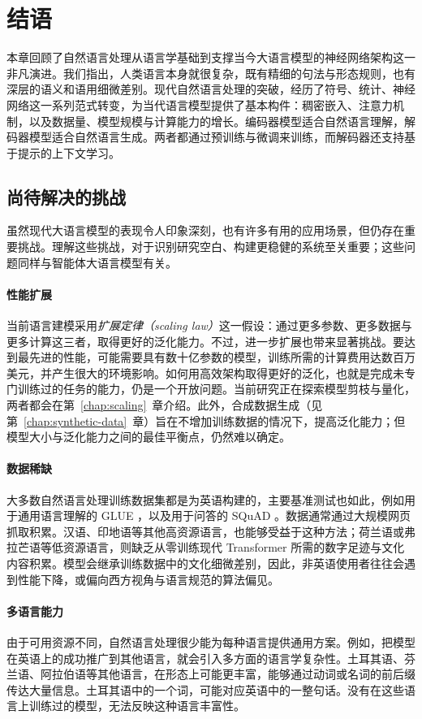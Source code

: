 \section{结语}
本章回顾了自然语言处理从语言学基础到支撑当今大语言模型的神经网络架构这一非凡演进。我们指出，人类语言本身就很复杂，既有精细的句法与形态规则，也有深层的语义和语用细微差别。现代自然语言处理的突破，经历了符号、统计、神经网络这一系列范式转变，为当代语言模型提供了基本构件：稠密嵌入、注意力机制，以及数据量、模型规模与计算能力的增长。编码器模型适合自然语言理解，解码器模型适合自然语言生成。两者都通过预训练与微调来训练，而解码器还支持基于提示的上下文学习。

\subsection{尚待解决的挑战}
虽然现代大语言模型的表现令人印象深刻，也有许多有用的应用场景，但仍存在重要挑战。理解这些挑战，对于识别研究空白、构建更稳健的系统至关重要；这些问题同样与智能体大语言模型有关。

\paragraph{性能扩展}
当前语言建模采用{\em 扩展定律（scaling law）}这一假设：通过更多参数、更多数据与更多计算这三者，取得更好的泛化能力。不过，进一步扩展也带来显著挑战。要达到最先进的性能，可能需要具有数十亿参数的模型，训练所需的计算费用达数百万美元，并产生很大的环境影响。如何用高效架构取得更好的泛化，也就是完成未专门训练过的任务的能力，仍是一个开放问题。当前研究正在探索模型剪枝与量化，两者都会在第~\ref{chap:scaling}~章介绍。此外，合成数据生成（见第~\ref{chap:synthetic-data}~章）旨在不增加训练数据的情况下，提高泛化能力；但模型大小与泛化能力之间的最佳平衡点，仍然难以确定。

\paragraph{数据稀缺}
大多数自然语言处理训练数据集都是为英语构建的，主要基准测试也如此，例如用于通用语言理解的 GLUE \citep{wang2018glue}，以及用于问答的 SQuAD \citep{rajpurkar2016squad}。数据通常通过大规模网页抓取积累。汉语、印地语等其他高资源语言，也能够受益于这种方法；荷兰语或弗拉芒语等低资源语言，则缺乏从零训练现代 Transformer 所需的数字足迹与文化内容积累。模型会继承训练数据中的文化细微差别，因此，非英语使用者往往会遇到性能下降，或偏向西方视角与语言规范的算法偏见。

\paragraph{多语言能力}
由于可用资源不同，自然语言处理很少能为每种语言提供通用方案。例如，把模型在英语上的成功推广到其他语言，就会引入多方面的语言学复杂性。土耳其语、芬兰语、阿拉伯语等其他语言，在形态上可能更丰富，能够通过动词或名词的前后缀传达大量信息。土耳其语中的一个词，可能对应英语中的一整句话。没有在这些语言上训练过的模型，无法反映这种语言丰富性。


